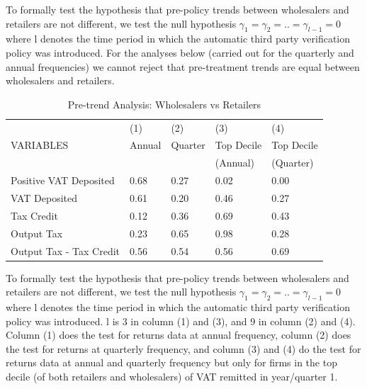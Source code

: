 To formally test the hypothesis that pre-policy trends between wholesalers and retailers are not different, we test the null hypothesis $\gamma_1=\gamma_2=..=\gamma_{l-1}=0$ where l denotes the time period in which the automatic third party verification policy was introduced. For the analyses below (carried out for the quarterly and annual frequencies) we cannot reject that pre-treatment trends are equal between wholesalers and retailers.  



\begin{table}[ht]
\footnotesize
\begin{threeparttable}
\begin{tabular}{lllll} \hline \hline
 & (1) & (2) & (3) & (4) \\
VARIABLES & Annual & Quarter & Top Decile &Top Decile  \\ 
 &  &  & (Annual) & (Quarter)  \\ \hline
Positive VAT Deposited & 0.68  & 0.27 & 0.02 &0.00 \\
VAT Deposited & 0.61 &  0.20 & 0.46 &0.27 \\
Tax Credit & 0.12 & 0.36 & 0.69 & 0.43 \\
Output Tax & 0.23 & 0.65 & 0.98 & 0.28 \\
Output Tax - Tax Credit & 0.56 & 0.54 & 0.56 & 0.69 \\ \hline
\end{tabular}
\begin{tablenotes}
To formally test the hypothesis that pre-policy trends between wholesalers and retailers are not different, we test the null hypothesis $\gamma_1=\gamma_2=..=\gamma_{l-1}=0$ where l denotes the time period in which the automatic third party verification policy was introduced. l is 3 in column (1) and (3), and 9 in column (2) and (4). Column (1) does the test for returns data at annual frequency, column (2) does the test for returns at quarterly frequency, and column (3) and (4) do the test for returns data at annual and quarterly frequency but only for firms in the top decile (of both retailers and wholesalers) of VAT remitted in year/quarter 1.
\end{tablenotes}
\caption{Pre-trend Analysis: Wholesalers vs Retailers}
\label{tbl:}
\end{threeparttable}
\end{table}


